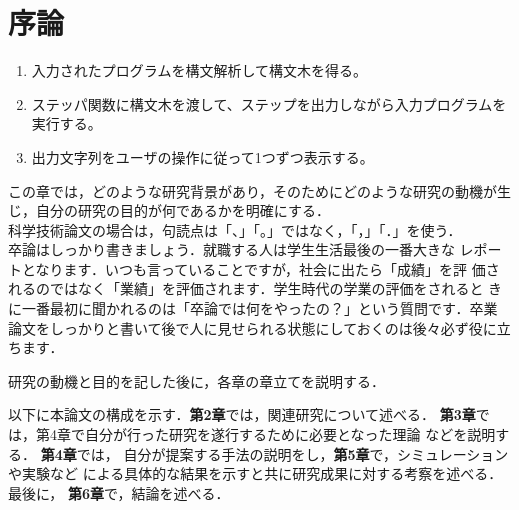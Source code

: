 \chapter{序論}

\begin{enumerate}
\item 入力されたプログラムを構文解析して構文木を得る。
\item ステッパ関数に構文木を渡して、ステップを出力しながら入力プログラムを実行する。
\item 出力文字列をユーザの操作に従って1つずつ表示する。
\end{enumerate}

この章では，どのような研究背景があり，そのためにどのような研究の動機が生
じ，自分の研究の目的が何であるかを明確にする．\\

科学技術論文の場合は，句読点は「、」「。」ではなく，「，」「．」を使う．
\\

卒論はしっかり書きましょう．就職する人は学生生活最後の一番大きな
レポートとなります．いつも言っていることですが，社会に出たら「成績」を評
価されるのではなく「業績」を評価されます．学生時代の学業の評価をされると
きに一番最初に聞かれるのは「卒論では何をやったの？」という質問です．卒業
論文をしっかりと書いて後で人に見せられる状態にしておくのは後々必ず役に立
ちます．\\

\vspace{2cm}

研究の動機と目的を記した後に，各章の章立てを説明する．

\vspace{1cm}
以下に本論文の構成を示す．{\bf 第2章}では，関連研究について述べる．
{\bf 第3章}では，第4章で自分が行った研究を遂行するために必要となった理論
などを説明する．
{\bf 第4章}では，
自分が提案する手法の説明をし，{\bf 第5章}で，シミュレーションや実験など
による具体的な結果を示すと共に研究成果に対する考察を述べる．最後に，{\bf
第6章}で，結論を述べる．
